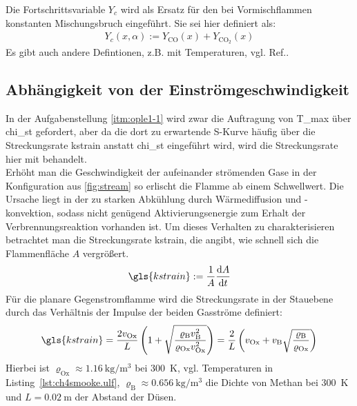 Die Fortschrittsvariable $Y_c$ wird als Ersatz für den bei Vormischflammen konstanten Mischungsbruch eingeführt. Sie sei hier definiert als:
\begin{align}
    \label{eq:pv}
    Y_c(x,\alpha) := Y_\mathrm{CO} (x) + Y_{\mathrm{CO}_2} (x)
\end{align}
Es gibt auch andere Defintionen, z.B. mit Temperaturen, vgl. Ref.\cite[45]{poinsot2005theoretical}.



\subsection{Abhängigkeit von der Einströmgeschwindigkeit}
\label{sct:skurve}

In der Aufgabenstellung \ref{itm:ople1-1} wird zwar die Auftragung von \gls{T_max} über \gls{chi_st} gefordert, aber da die dort zu erwartende S-Kurve häufig über die Streckungsrate \gls{kstrain} anstatt \gls{chi_st} eingeführt wird, wird die Streckungsrate hier mit behandelt.\\

Erhöht man die Geschwindigkeit der aufeinander strömenden Gase in der Konfiguration aus \autoref{fig:stream} so erlischt die Flamme ab einem Schwellwert. Die Ursache liegt in der zu starken Abkühlung durch Wärmediffusion und -konvektion, sodass nicht genügend Aktivierungsenergie zum Erhalt der Verbrennungsreaktion vorhanden ist. Um dieses Verhalten zu charakterisieren betrachtet man die Streckungsrate \gls{kstrain}, die angibt, wie schnell sich die Flammenfläche $A$ vergrößert.
\begin{align}
    \gls{kstrain}
    := \frac{1}{A} \ftdif{A}{t}
\end{align}
Für die planare Gegenstromflamme wird die Streckungsrate in der Stauebene durch das Verhältnis der Impulse der beiden Gasströme definiert\cite{seshadri1978}\cite{fisher1997determination}:
\begin{align}
    \label{eq:kstrain}
    \gls{kstrain}
    = \frac{2 v_\mathrm{Ox}}{L} \left( 1 +
        \sqrt{ \frac{ \varrho_\mathrm{B} v_\mathrm{B}^2 }
        { \varrho_\mathrm{Ox} v_\mathrm{Ox}^2 } } \right)
    = \frac{2}{L} \left( v_\mathrm{Ox} + v_\mathrm{B}
      \sqrt{ \frac{ \varrho_\mathrm{B} }{ \varrho_\mathrm{Ox} } } \right)
\end{align}
Hierbei ist $\varrho_\mathrm{Ox} \approx \SI{1.16}{\kilo\gram\per\cubic\meter}$ bei \SI{300}{\kelvin}, vgl. Temperaturen in Listing~\ref{lst:ch4smooke.ulf}, $\varrho_\mathrm{B} \approx \SI{0.656}{\kilo\gram\per\cubic\meter}$ die Dichte von Methan bei \SI{300}{\kelvin} und $L=\SI{0.02}{\meter}$ der Abstand der Düsen.\\

